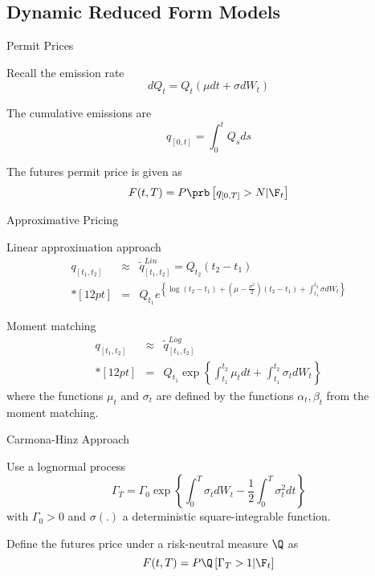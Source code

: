 \subsection{Dynamic Reduced Form Models}

{Permit Prices}


	Recall the emission rate
$$
dQ_t = Q_t(\mu dt + \sigma dW_t)
$$

The cumulative emissions are
$$
q_{[0,t]} = \int_0^t Q_s ds
$$

The futures permit price is given as
$$
F(t,T) = P \prb\left[q_{[0,T]}>N |\F_t\right]
$$


{Approximative Pricing}


	Linear approximation approach
$$
\begin{array}{lll}
q_{[t_1,t_2]} &\approx& \tilde{q}^{Lin}_{[t_1,t_2]} = Q_{t_2} (t_2 - t_1) \\*[12pt]
&=&\displaystyle   Q_{t_1} e^{\left\{\log (t_2 - t_1) + \left(\mu-\frac{\sigma^2}{2}\right)(t_2-t_1)+\int_{t_1}^{t_2}\sigma dW_t\right\}}
\end{array}
$$

	Moment matching
$$
\begin{array}{lll}
q_{[t_1,t_2]} &\approx& \tilde{q}^{Log}_{[t_1,t_2]}\\*[12pt]
&=& Q_{t_1} \exp\left\{ \int_{t_1}^{t_2}\mu_t dt + \int_{t_1}^{t_2} \sigma_t dW_t\right\}
\end{array}
$$
where the functions $\mu_t$ and $\sigma_t$ are defined by the functions $\alpha_t, \beta_t$ from the moment matching.



{Carmona-Hinz Approach}


	Use a lognormal process
$$
\Gamma_{T}= \Gamma_0  \exp{\left\{\int_{0}^{T}\sigma_t dW_t -\frac{1}{2}\int_0^T \sigma^2_t dt\right\}}
$$
with $\Gamma_0 >0$ and $\sigma(.)$ a deterministic square-integrable function.

	Define the futures price under a risk-neutral measure $\Q$ as
$$
F(t,T) = P \Q\left[\Gamma_T>1 |\F_t\right]
$$

